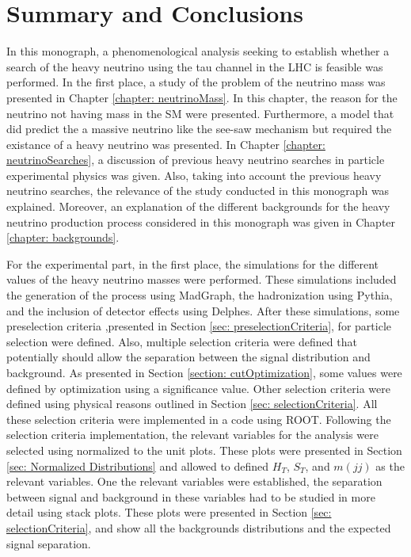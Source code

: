 \chapter{Summary and Conclusions}\label{chapter: conclusions}

In this monograph, a phenomenological analysis seeking to establish whether a search of the heavy neutrino using the tau channel in the LHC is feasible was performed. In the first place, a study of the problem of the neutrino mass was presented in Chapter \ref{chapter: neutrinoMass}. In this chapter, the reason for the neutrino not having mass in the SM were presented. Furthermore, a model that did predict the a massive neutrino like the see-saw mechanism but required the existance of a heavy neutrino was presented. In Chapter \ref{chapter: neutrinoSearches}, a discussion of previous heavy neutrino searches in particle experimental physics was given. Also, taking into account the previous heavy neutrino searches, the relevance of the study conducted in this monograph was explained. Moreover, an explanation of the different backgrounds for the heavy neutrino production process considered in this monograph was given in Chapter \ref{chapter: backgrounds}.

For the experimental part, in the first place, the simulations for the different values of the heavy neutrino masses were performed. These simulations included the generation of the process using MadGraph, the hadronization using Pythia, and the inclusion of detector effects using Delphes. After these simulations, some preselection criteria ,presented in Section \ref{sec: preselectionCriteria}, for particle selection were defined. Also, multiple selection criteria were defined that potentially should allow the separation between the signal distribution and background. As presented in Section \ref{section: cutOptimization}, some values were defined by optimization using a significance value. Other selection criteria were defined using physical reasons outlined in Section \ref{sec: selectionCriteria}. All these selection criteria were implemented in a code using ROOT. Following the selection criteria implementation, the relevant variables for the analysis were selected using normalized to the unit plots. These plots were presented in Section \ref{sec: Normalized Distributions} and allowed to defined $H_{T}$, $S_{T}$, and $m(jj)$ as the relevant variables. One the relevant variables were established, the separation between signal and background in these variables had to be studied in more detail using stack plots. These plots were presented in Section \ref{sec: selectionCriteria}, and show all the backgrounds distributions and the expected signal separation.

